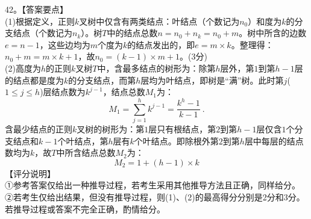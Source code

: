 42。【答案要点】 \\
(1)根据定义，正则$k$叉树中仅含有两类结点：叶结点（个数记为$n_0$）和度为$k$的分支结点（个数记为$n_k$）。树$T$中的结点总数$n=n_0+n_k=n_0+m$。树中所含的边数$e=n-1$，这些边均为$m$个度为$k$的结点发出的，即$e=m\times k$。整理得：$n_0+m=m\times k+1$，故$n_0=(k-1)\times m+1$。(3分) \\
(2)高度为$h$的正则$k$叉树$T$中，含最多结点的树形为：除第$h$层外，第$1$到第$h-1$层的结点都是度为$k$的分支结点，而第$h$层均为叶结点，即树是“满”树。此时第$j$($1\leqslant j\leqslant h$)层结点数为$k^{j-1}$，结点总数$M_1$为：
\begin{equation}
M_1=\sum_{j=1}^{h}k^{j-1}=\frac{k^h-1}{k-1}~.
\end{equation}
含最少结点的正则$k$叉树的树形为：第$1$层只有根结点，第$2$到第$h-1$层仅含$1$个分支结点和$k-1$个叶结点，第$h$层有$k$个叶结点。即除根外第$2$到第$h$层中每层的结点数均为$k$，故$T$中所含结点总数$M_2$为： \\
\begin{equation}
M_2=1+(h-1)\times k
\end{equation}
【评分说明】 \\
①参考答案仅给出一种推导过程，若考生采用其他推导方法且正确，同样给分。 \\
②若考生仅给出结果，但没有推导过程，则(1)、(2)的最高得分分别是2分和3分。若推导过程或答案不完全正确，酌情给分。

